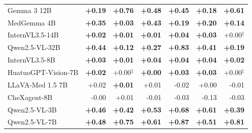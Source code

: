 \begin{table}[htbp]
\begin{tabular}{lrrrrrr}
Gemma 3 12B & \cellcolor{cfSlate3}\textbf{+0.19} & \cellcolor{cfSlate4}\textbf{+0.76} & \cellcolor{cfSlate4}\textbf{+0.48} & \cellcolor{cfSlate4}\textbf{+0.45} & \cellcolor{cfSlate3}\textbf{+0.18} & \cellcolor{cfSlate4}\textbf{+0.61} \\
MedGemma 4B & \cellcolor{cfSlate4}\textbf{+0.35} & \cellcolor{cfSlate2}\textbf{+0.03} & \cellcolor{cfSlate4}\textbf{+0.43} & \cellcolor{cfSlate3}\textbf{+0.19} & \cellcolor{cfSlate3}\textbf{+0.20} & \cellcolor{cfSlate3}\textbf{+0.14} \\
InternVL3.5-14B & \cellcolor{cfSlate1}\textbf{+0.02} & \cellcolor{cfSlate1}\textbf{+0.01} & \cellcolor{cfSlate1}\textbf{+0.01} & \cellcolor{cfSlate2}\textbf{+0.04} & \cellcolor{cfSlate2}\textbf{+0.03} & \cellcolor{cfSlate1}+0.00$^{\ddagger}$ \\
Qwen2.5-VL-32B & \cellcolor{cfSlate4}\textbf{+0.44} & \cellcolor{cfSlate3}\textbf{+0.12} & \cellcolor{cfSlate4}\textbf{+0.27} & \cellcolor{cfSlate4}\textbf{+0.83} & \cellcolor{cfSlate4}\textbf{+0.41} & \cellcolor{cfSlate3}\textbf{+0.19} \\
InternVL3.5-8B & \cellcolor{cfSlate2}\textbf{+0.03} & \cellcolor{cfSlate1}\textbf{+0.01} & \cellcolor{cfSlate2}\textbf{+0.04} & \cellcolor{cfSlate2}\textbf{+0.04} & \cellcolor{cfSlate2}\textbf{+0.04} & \cellcolor{cfSlate1}\textbf{+0.02} \\
HuatuoGPT-Vision-7B & \cellcolor{cfSlate1}\textbf{+0.02} & \cellcolor{cfSlate1}+0.00$^{\ddagger}$ & \cellcolor{cfSlate1}\textbf{+0.00} & \cellcolor{cfSlate2}\textbf{+0.03} & \cellcolor{cfSlate2}\textbf{+0.03} & \cellcolor{cfSlate1}+0.00$^{\ddagger}$ \\
LLaVA-Med 1.5 7B & \cellcolor{cfSlate1}+0.02 & \cellcolor{cfSlate1}\textbf{+0.01} & \cellcolor{cfSlate1}+0.01 & \cellcolor{cfTerra2}-0.02 & \cellcolor{cfSlate1}+0.00 & \cellcolor{cfTerra1}-0.01 \\
CheXagent-8B & \cellcolor{cfTerra1}-0.00 & \cellcolor{cfSlate1}+0.01 & \cellcolor{cfTerra1}-0.01 & \cellcolor{cfTerra2}-0.03 & \cellcolor{cfTerra3}-0.13 & \cellcolor{cfTerra2}-0.03 \\
Qwen2.5-VL-3B & \cellcolor{cfSlate4}\textbf{+0.46} & \cellcolor{cfSlate4}\textbf{+0.42} & \cellcolor{cfSlate4}\textbf{+0.53} & \cellcolor{cfSlate4}\textbf{+0.68} & \cellcolor{cfSlate4}\textbf{+0.61} & \cellcolor{cfSlate4}\textbf{+0.39} \\
Qwen2.5-VL-7B & \cellcolor{cfSlate4}\textbf{+0.48} & \cellcolor{cfSlate4}\textbf{+0.75} & \cellcolor{cfSlate4}\textbf{+0.61} & \cellcolor{cfSlate4}\textbf{+0.87} & \cellcolor{cfSlate4}\textbf{+0.51} & \cellcolor{cfSlate4}\textbf{+0.81} \\

\end{tabular}
\end{table}

